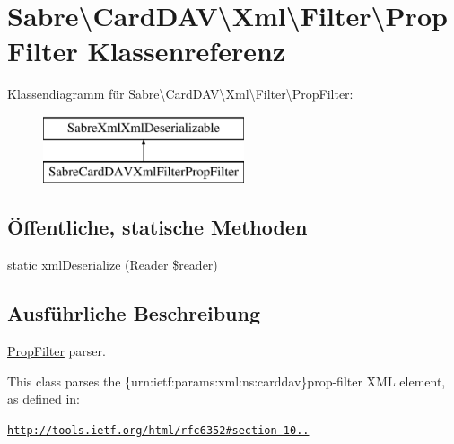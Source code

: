 \hypertarget{class_sabre_1_1_card_d_a_v_1_1_xml_1_1_filter_1_1_prop_filter}{}\section{Sabre\textbackslash{}Card\+D\+AV\textbackslash{}Xml\textbackslash{}Filter\textbackslash{}Prop\+Filter Klassenreferenz}
\label{class_sabre_1_1_card_d_a_v_1_1_xml_1_1_filter_1_1_prop_filter}
Klassendiagramm für Sabre\textbackslash{}Card\+D\+AV\textbackslash{}Xml\textbackslash{}Filter\textbackslash{}Prop\+Filter\+:\begin{figure}[H]
\begin{center}
\leavevmode
\includegraphics[height=2.000000cm]{class_sabre_1_1_card_d_a_v_1_1_xml_1_1_filter_1_1_prop_filter}
\end{center}
\end{figure}
\subsection*{Öffentliche, statische Methoden}
\begin{DoxyCompactItemize}
\item 
static \mbox{\hyperlink{class_sabre_1_1_card_d_a_v_1_1_xml_1_1_filter_1_1_prop_filter_a9e4d746653a1a05ca702ec481e8ad049}{xml\+Deserialize}} (\mbox{\hyperlink{class_sabre_1_1_xml_1_1_reader}{Reader}} \$reader)
\end{DoxyCompactItemize}


\subsection{Ausführliche Beschreibung}
\mbox{\hyperlink{class_sabre_1_1_card_d_a_v_1_1_xml_1_1_filter_1_1_prop_filter}{Prop\+Filter}} parser.

This class parses the \{urn\+:ietf\+:params\+:xml\+:ns\+:carddav\}prop-\/filter X\+ML element, as defined in\+:

\href{http://tools.ietf.org/html/rfc6352#section-10.5.1}{\tt http\+://tools.\+ietf.\+org/html/rfc6352\#section-\/10..}

